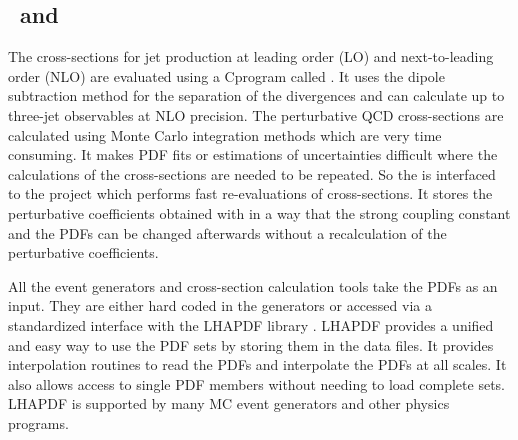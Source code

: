\subsection{\NLOJET~and \fastNLO}
\label{Sec:NLO}
The cross-sections for jet production at leading order (LO) and next-to-leading order (NLO) are evaluated using a C\plusn\plus program called \NLOJETPP \cite{Nagy:2001fj,Nagy:2003tz}. It uses the dipole subtraction method for the separation of the divergences and can calculate up to three-jet observables at NLO precision. The perturbative QCD cross-sections are calculated using Monte Carlo integration methods which are very time consuming. It makes PDF fits or estimations of uncertainties difficult where the calculations of the cross-sections are needed to be repeated. So the \NLOJETPP is interfaced to the \fastNLO project \cite{Kluge:2006xs,Britzger:2012bs} which performs fast re-evaluations of cross-sections. It stores the perturbative coefficients obtained with \NLOJETPP in a way that the strong coupling constant and the PDFs can be changed afterwards without a recalculation of the perturbative coefficients.

All the event generators and cross-section calculation tools take the PDFs as an input. They are either hard coded in the generators or accessed via a standardized interface with the LHAPDF library \cite{Whalley:2005nh,Buckley:2014ana}. LHAPDF provides a unified and easy way to use the PDF sets by storing them in the data files. It provides interpolation routines to read the PDFs and interpolate the PDFs at all scales. It also allows access to single PDF members without needing to load complete sets. LHAPDF is supported by many MC event generators and other physics programs.

